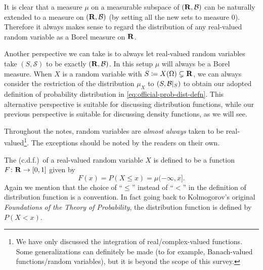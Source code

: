 It is clear that a measure $\mu$ on a measurable subspace of $(\mathbf{R},\mathcal{B})$ can be naturally extended to a measure on $(\mathbf{R},\mathcal{B})$ (by setting all the new sets to measure $0$). Therefore it always makes sense to regard the distribution of any real-valued random variable as a Borel measure on $\mathbf{R}$.

\begin{rem}
    Another perspective we can take is to always let real-valued random variables take $(S,\mathcal S)$ to be exactly $(\mathbf{R},\mathcal{B})$. In this setup $\mu$ will always be a Borel measure. When $X$ is a random variable with $S \coloneqq X(\Omega)\subsetneq \mathbf{R}$, we can always consider the restriction of the distribution $\mu_X$ to $(S,\mathcal{B}|_S)$ to obtain our adopted definition of probability distribution in \eqref{eq:official-prob-dist-defn}. This alternative perspective is suitable for discussing distribution functions, while our previous perspective is suitable for discussing density functions, as we will see.
\end{rem}

\begin{rem}
Throughout the notes, random variables are \emph{almost always} taken to be real-valued\footnote{We have only discussed the integration of real/complex-valued functions. Some generalizations can definitely be made (to for example, Banach-valued functions/random variables), but it is beyond the scope of this survey.}. The exceptions should be noted by the readers on their own.
\end{rem}

The  (c.d.f.)\ of a real-valued random variable $X$ is defined to be a function $F\colon \mathbf{R} \to [0,1]$ given by \[
    F(x) = P(X \leq x) = \mu(-\infty,x].
\]
Again we mention that the choice of ``$\leq$'' instead of ``$<$'' in the definition of distribution function is a convention. In fact going back to Kolmogorov's original \textit{Foundations of the Theory of Probability}, the distribution function is defined by $P(X < x)$.

